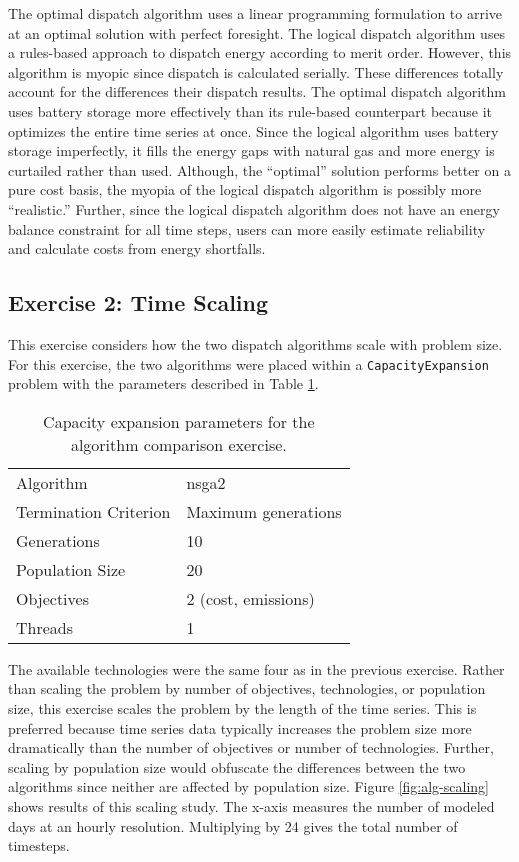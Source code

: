 The optimal dispatch algorithm uses a linear programming formulation to arrive
at an optimal solution with perfect foresight. The logical dispatch algorithm
uses a rules-based approach to dispatch energy according to merit order.
However, this algorithm is myopic since dispatch is calculated serially. These
differences totally account for the differences their dispatch results. The
optimal dispatch algorithm uses battery storage more effectively than its
rule-based counterpart because it optimizes the entire time series at once.
Since the logical algorithm uses battery storage imperfectly, it fills the
energy gaps with natural gas and more energy is curtailed rather than used.
Although, the ``optimal'' solution performs better on a pure cost basis, the
myopia of the logical dispatch algorithm is possibly more ``realistic.''
Further, since the logical dispatch algorithm does not have an energy balance
constraint for all time steps, users can more easily estimate reliability and
calculate costs from energy shortfalls.


\FloatBarrier

\subsection{Exercise 2: Time Scaling}

This exercise considers how the two dispatch algorithms scale with problem size.
For this exercise, the two algorithms were placed within a
\texttt{CapacityExpansion} problem with the parameters described in Table
\ref{tab:scaling-ga-params}.

\begin{table}[htbp!]
    \centering
    \caption{Capacity expansion parameters for the algorithm comparison exercise.}
    \label{tab:scaling-ga-params}
    \begin{tabular}{ll}
        \toprule
        Algorithm & \acs{nsga2}\\
        Termination Criterion & Maximum generations\\
        Generations & 10 \\
        Population Size & 20 \\
        Objectives & 2 (cost, emissions)\\
        Threads & 1 \\
        \bottomrule
    \end{tabular}
\end{table}

\noindent The available technologies were the same four as in the previous
exercise. Rather than scaling the problem by number of objectives, technologies,
or population size, this exercise scales the problem by the length of the time
series. This is preferred because time series data typically increases the
problem size more dramatically than the number of objectives or number of
technologies. Further, scaling by population size would obfuscate the
differences between the two algorithms since neither are affected by population
size. Figure \ref{fig:alg-scaling} shows results of this scaling study. The
x-axis measures the number of modeled days at an hourly resolution. Multiplying
by 24 gives the total number of timesteps.

